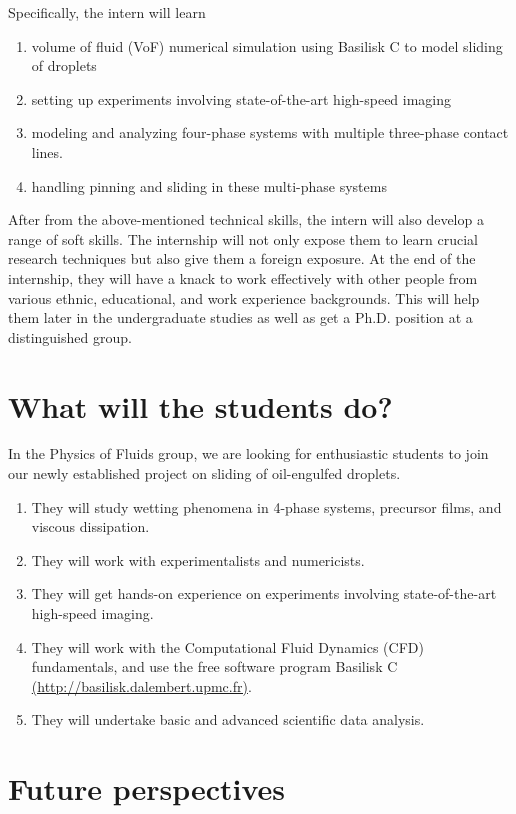 \documentclass[a4paper,10pt]{article}
\begin{document}
\noindent Specifically, the intern will learn

\begin{enumerate}
	\item volume of fluid (VoF) numerical simulation using Basilisk C to model sliding of droplets
	\item setting up experiments involving state-of-the-art high-speed imaging
	\item modeling and analyzing four-phase systems with multiple three-phase contact lines. 
	\item handling pinning and sliding in these multi-phase systems
\end{enumerate}


\noindent After from the above-mentioned technical skills, the intern will also develop a range of soft skills. The internship will not only expose them to learn crucial research techniques but also give them a foreign exposure. At the end of the internship, they will have a knack to work effectively with other people from various ethnic, educational, and work experience backgrounds. This will help them later in the undergraduate studies as well as get a Ph.D. position at a distinguished group.

\section*{What will the students do?}
In the Physics of Fluids group, we are looking for enthusiastic students to join our newly established project on sliding of oil-engulfed droplets.
\begin{enumerate}
	\item They will study wetting phenomena in 4-phase systems, precursor films, and viscous dissipation. 
	\item They will work with experimentalists and numericists. 
	\item They will get hands-on experience on experiments involving state-of-the-art high-speed imaging.
	\item They will work with the Computational Fluid Dynamics (CFD) fundamentals, and use the free software program Basilisk C \href{http://basilisk.dalembert.upmc.fr}{(http://basilisk.dalembert.upmc.fr)}.
	\item They will undertake basic and advanced scientific data analysis.
\end{enumerate}

\section*{Future perspectives}
\end{document}
